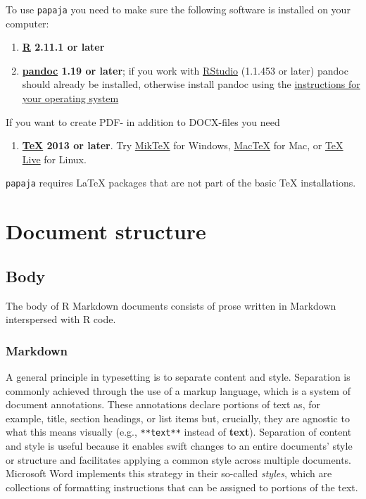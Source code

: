 \documentclass[man,floatsintext]{apa6}
\providecommand{\tightlist}{%
  \setlength{\itemsep}{0pt}\setlength{\parskip}{0pt}}
\theoremstyle{definition}
\theoremstyle{definition}
\theoremstyle{definition}
\theoremstyle{remark}
\begin{document}
To use \texttt{papaja} you need to make sure the following software is
installed on your computer:

\begin{enumerate}
\def\labelenumi{\arabic{enumi}.}
\tightlist
\item
  \textbf{\href{http://www.r-project.org/}{R} 2.11.1 or later}
\item
  \textbf{\href{http://johnmacfarlane.net/pandoc/}{pandoc} 1.19 or
  later}; if you work with \href{http://www.rstudio.com/}{RStudio}
  (1.1.453 or later) pandoc should already be installed, otherwise
  install pandoc using the
  \href{https://github.com/rstudio/rmarkdown/blob/master/PANDOC.md}{instructions
  for your operating system}
\end{enumerate}

If you want to create PDF- in addition to DOCX-files you need

\begin{enumerate}
\def\labelenumi{\arabic{enumi}.}
\setcounter{enumi}{2}
\tightlist
\item
  \textbf{\href{http://de.wikipedia.org/wiki/TeX}{TeX} 2013 or later}.
  Try \href{http://miktex.org/}{MikTeX} for Windows,
  \href{https://tug.org/mactex/}{MacTeX} for Mac, or
  \href{http://www.tug.org/texlive/}{TeX Live} for Linux.
\end{enumerate}

\texttt{papaja} requires LaTeX packages that are not part of the basic
TeX installations.

\section{Document structure}\label{document-structure}

\subsection{Body}\label{body}

The body of R Markdown documents consists of prose written in Markdown
interspersed with R code.

\subsubsection{Markdown}\label{markdown}

A general principle in typesetting is to separate content and style.
Separation is commonly achieved through the use of a markup language,
which is a system of document annotations. These annotations declare
portions of text as, for example, title, section headings, or list items
but, crucially, they are agnostic to what this means visually (e.g.,
\texttt{**text**} instead of \textbf{text}). Separation of content and
style is useful because it enables swift changes to an entire documents'
style or structure and facilitates applying a common style across
multiple documents. Microsoft Word implements this strategy in their
so-called \emph{styles}, which are collections of formatting
instructions that can be assigned to portions of the text.
\end{document}
